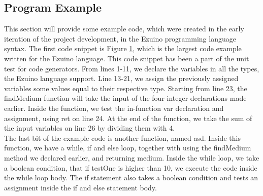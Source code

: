 \subsection{Program Example}
This section will provide some example code, which were created in the early iteration of the project development, in the Ezuino programming language syntax. The first code snippet is Figure \ref{ex01}, which is the largest code example written for the Ezuino language. This code snippet has been a part of the unit test for code generators. From lines 1-11, we declare the variables in all the types, the Ezuino language support. Line 13-21, we assign the previously assigned variables some values equal to their respective type. Starting from line 23, the findMedium function will take the input of the four integer declarations made earlier. Inside the function, we test the in-function var declaration and assignment, using ret on line 24. At the end of the function, we take the sum of the input variables on line 26 by dividing them with 4. \\
The last bit of the example code is another function, named asd. Inside this function, we have a while, if and else loop, together with using the findMedium method we declared earlier, and returning medium. Inside the while loop, we take a boolean condition, that if testOne is higher than 10, we execute the code inside the while loop body. The if statement also takes a boolean condition and tests an assignment inside the if and else statement body.
\begin{figure}[H]
\centering
{}
\caption{}
\label{ex01}
\end{figure}

